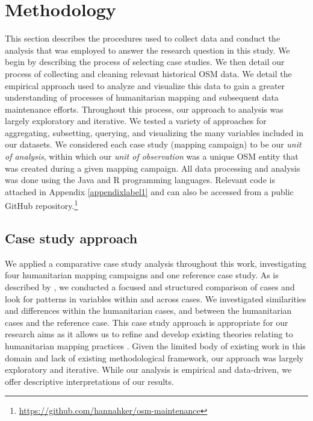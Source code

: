 \chapter{Methodology}
\label{chapterlabel4}

This section describes the procedures used to collect data and conduct the analysis that was employed to answer the research question in this study. We begin by describing the process of selecting case studies. We then detail our process of collecting and cleaning relevant historical OSM data. We detail the empirical approach used to analyze and visualize this data to gain a greater understanding of processes of humanitarian mapping and subsequent data maintenance efforts. Throughout this process, our approach to analysis was largely exploratory and iterative. We tested a variety of approaches for aggregating, subsetting, querying, and visualizing the many variables included in our datasets. We considered each case study (mapping campaign) to be our \textit{unit of analysis}, within which our \textit{unit of observation} was a unique OSM entity that was created during a given mapping campaign. All data processing and analysis was done using the Java and R programming languages. Relevant code is attached in Appendix \ref{appendixlabel1} and can also be accessed from a public GitHub repository.\footnote{\url{https://github.com/hannahker/osm-maintenance}} 

\section{Case study approach}

We applied a comparative case study analysis throughout this work, investigating four humanitarian mapping campaigns and one reference case study. As is described by \textcite{kaarbo_practical_1999}, we conducted a focused and structured comparison of cases and look for patterns in variables within and across cases. We investigated similarities and differences within the humanitarian cases, and between the humanitarian cases and the reference case. This case study approach is appropriate for our research aims as it allows us to refine and develop existing theories relating to humanitarian mapping practices \parencite{kaarbo_practical_1999}. Given the limited body of existing work in this domain and lack of existing methodological framework, our approach was largely exploratory and iterative. While our analysis is empirical and data-driven, we offer descriptive interpretations of our results.

